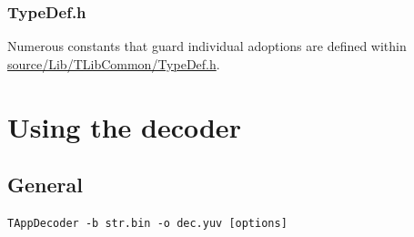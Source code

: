 \documentclass[a4paper,11pt]{jctvcdoc}
\begin{document}
\subsubsection*{TypeDef.h}
Numerous constants that guard individual adoptions are defined within
\url{source/Lib/TLibCommon/TypeDef.h}.


\clearpage
\section{Using the decoder}
\subsection{General}
\begin{verbatim}
TAppDecoder -b str.bin -o dec.yuv [options]
\end{verbatim}
\end{document}
